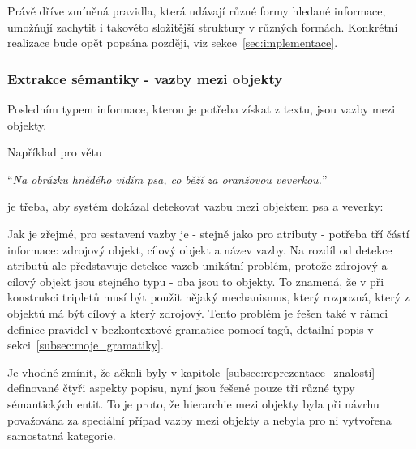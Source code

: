 Právě dříve zmíněná pravidla, která udávají různé formy hledané informace, umožňují zachytit i takovéto složitější struktury v různých formách.
Konkrétní realizace bude opět popsána později, viz sekce~\ref{sec:implementace}.

\newpage
\subsubsection{Extrakce sémantiky - vazby mezi objekty}
Posledním typem informace, kterou je potřeba získat z textu, jsou vazby mezi objekty.

Například pro větu
\begin{center}
	\enquote{\emph{Na obrázku hnědého vidím psa, co běží za oranžovou veverkou.}}
\end{center}
je třeba, aby systém dokázal detekovat vazbu mezi objektem psa a veverky:
\begin{center}
\end{center}

Jak je zřejmé, pro sestavení vazby je - stejně jako pro atributy - potřeba tří částí informace: zdrojový objekt, cílový objekt a název vazby.
Na rozdíl od detekce atributů ale představuje detekce vazeb unikátní problém, protože zdrojový a cílový objekt jsou stejného typu - oba jsou to objekty.
To znamená, že v při konstrukci tripletů musí být použit nějaký mechanismus, který rozpozná, který z objektů má být cílový a který zdrojový.
Tento problém je řešen také v rámci definice pravidel v bezkontextové gramatice pomocí tagů, detailní popis v sekci~\ref{subsec:moje_gramatiky}.

Je vhodné zmínit, že ačkoli byly v kapitole~\ref{subsec:reprezentace_znalosti} definované čtyři aspekty popisu,
nyní jsou řešené pouze tři různé typy sémantických entit.
To je proto, že hierarchie mezi objekty byla při návrhu považována za speciální případ vazby mezi objekty a nebyla pro ni vytvořena samostatná kategorie.
